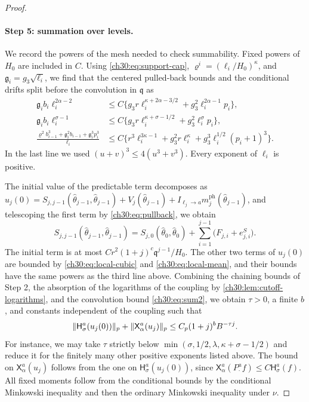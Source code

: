 \begin{proof}
\paragraph{Step 5: summation over levels.} We record the powers of the mesh needed to check summability. Fixed powers of $H_0$ are included in $C$. Using \eqref{ch30:eq:support-cap}, $\varrho^i=(\ell_i/H_0)^\kappa$, and $\mathfrak g_i=g_3\sqrt{\ell_i}$, we find that the centered pulled-back bounds and the conditional drifts split before the convolution in $\mathfrak q$ as
\begin{align*}
 \mathfrak g_ib_i\ell_i^{2\alpha-2}&\le C\bigl\{g_3r\ell_i^{\kappa+2\alpha-3/2}+g_3^2\ell_i^{2\alpha-1}p_i\bigr\},\\
 \mathfrak g_ib_i\ell_i^{\sigma-1}&\le C\bigl\{g_3r\ell_i^{\kappa+\sigma-1/2}+g_3^2\ell_i^\sigma p_i\bigr\},\\
 \frac{\varrho^2b_{i-1}^3+\mathfrak g_i^2b_{i-1}+\mathfrak g_i^3p_i^3}{\ell_i}&\le C\bigl\{r^3\ell_i^{3\kappa-1}+g_3^2r\ell_i^\kappa+g_3^3\ell_i^{1/2}(p_i+1)^3\bigr\}.
\end{align*}
In the last line we used $(u+v)^3\le4(u^3+v^3)$. Every exponent of $\ell_i$ is positive.

The initial value of the predictable term decomposes as $u_j(0)=S_{j,j-1}(\widehat\theta_{j-1},\widehat\theta_{j-1})+V_j(\widehat\theta_{j-1})+I_{\ell_j\to a}m_j^{\mathrm{ph}}(\widehat\theta_{j-1})$, and telescoping the first term by \eqref{ch30:eq:pullback}, we obtain
\[
 S_{j,j-1}(\widehat\theta_{j-1},\widehat\theta_{j-1})=S_{j,0}(\widehat\theta_0,\widehat\theta_0)+\sum_{i=1}^{j-1}\bigl(F_{j,i}+e^S_{j,i}\bigr).
\]
The initial term is at most $Cr^2(1+j)^c\mathfrak q^{j-1}/H_0$. The other two terms of $u_j(0)$ are bounded by \eqref{ch30:eq:local-cubic} and \eqref{ch30:eq:local-mean}, and their bounds have the same powers as the third line above. Combining the chaining bounds of Step 2, the absorption of the logarithms of the coupling by \cref{ch30:lem:cutoff-logarithms}, and the convolution bound \eqref{ch30:eq:sum2}, we obtain $\tau>0$, a finite $b$, and constants independent of the coupling such that
\begin{equation}\label{ch30:eq:uniform-U}
 \lVert \mathsf H_\sigma^a(u_j(0))\rVert_p+\lVert \mathsf X_\alpha^a(u_j)\rVert_p\le C_p(1+j)^bB^{-\tau j}.
\end{equation}
For instance, we may take $\tau$ strictly below $\min(\sigma,1/2,\lambda,\kappa+\sigma-1/2)$ and reduce it for the finitely many other positive exponents listed above. The bound on $\mathsf X_\alpha^a(u_j)$ follows from the one on $\mathsf H_\sigma^a(u_j(0))$, since $\mathsf X_\alpha^a(P_\cdot^af)\le C\mathsf H_\sigma^a(f)$. All fixed moments follow from the conditional bounds by the conditional Minkowski inequality and then the ordinary Minkowski inequality under $\nu$.


\end{proof}
